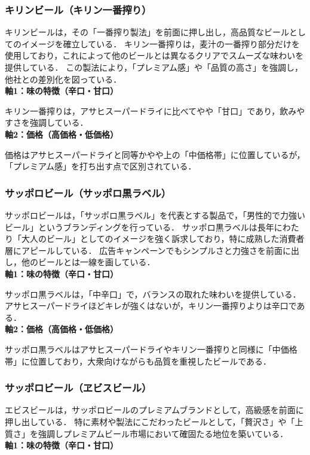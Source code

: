 \documentclass[titlepage,a4paper]{jsarticle}
\begin{document}
\subsubsection{キリンビール（キリン一番搾り）}
キリンビールは，その「一番搾り製法」を前面に押し出し，高品質なビールとしてのイメージを確立している．
キリン一番搾りは，麦汁の一番搾り部分だけを使用しており，これによって他のビールとは異なるクリアでスムーズな味わいを提供している．
この製法により，「プレミアム感」や「品質の高さ」を強調し，他社との差別化を図っている．
\\\textbf{軸1：味の特徴（辛口・甘口）}

キリン一番搾りは，アサヒスーパードライに比べてやや「甘口」であり，飲みやすさを強調している．
\\\textbf{軸2：価格（高価格・低価格）}

価格はアサヒスーパードライと同等かやや上の「中価格帯」に位置しているが，「プレミアム感」を打ち出す点で区別されている．

\subsubsection{サッポロビール（サッポロ黒ラベル）}
サッポロビールは，「サッポロ黒ラベル」を代表とする製品で，「男性的で力強いビール」というブランディングを行っている．
サッポロ黒ラベルは長年にわたり「大人のビール」としてのイメージを強く訴求しており，特に成熟した消費者層にアピールしている．
広告キャンペーンでもシンプルさと力強さを前面に出し，他のビールとは一線を画している．
\\\textbf{軸1：味の特徴（辛口・甘口）}

サッポロ黒ラベルは，「中辛口」で，バランスの取れた味わいを提供している．
アサヒスーパードライほどキレが強くはないが，キリン一番搾りよりは辛口である．
\\\textbf{軸2：価格（高価格・低価格）}

サッポロ黒ラベルはアサヒスーパードライやキリン一番搾りと同様に「中価格帯」に位置しており，大衆向けながらも品質を重視したビールである．

\subsubsection{サッポロビール（ヱビスビール）}
エビスビールは，サッポロビールのプレミアムブランドとして，高級感を前面に押し出している．
特に素材や製法にこだわったビールとして，「贅沢さ」や「上質さ」を強調しプレミアムビール市場において確固たる地位を築いている．
\\\textbf{軸1：味の特徴（辛口・甘口）}
\end{document}
